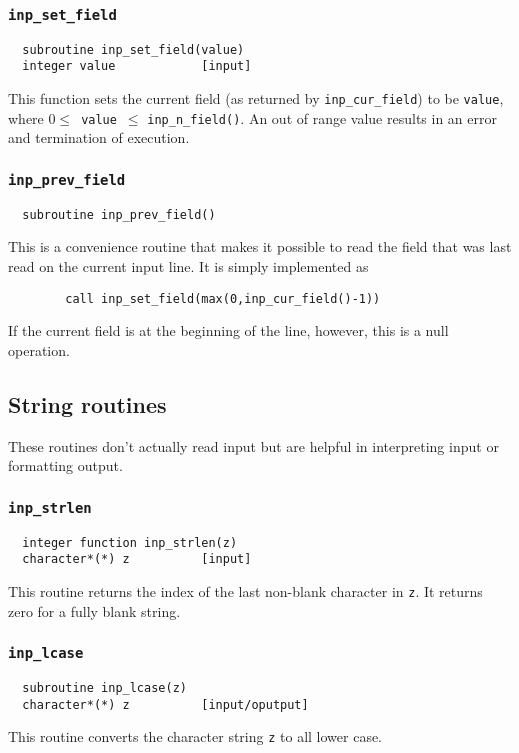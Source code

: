 \subsubsection{{\tt inp\_set\_field}}
\begin{verbatim}
  subroutine inp_set_field(value)
  integer value            [input]
\end{verbatim}
This function sets the current field (as returned by \verb+inp_cur_field+) to be
\verb+value+, where  $0 \le$~{\tt value}~$\le$ {\tt inp\_n\_field()}.  An out of
range value results in an error and termination of execution.

\subsubsection{{\tt inp\_prev\_field}}
\begin{verbatim}
  subroutine inp_prev_field()
\end{verbatim}
This is a convenience routine that makes it possible to read the field
that was last read on the current input line.  It is simply implemented as
\begin{verbatim}
        call inp_set_field(max(0,inp_cur_field()-1))
\end{verbatim}
If the current field is at the beginning of the line, however,
this is a null operation.


\subsection{String routines}
These routines don't actually read input but are helpful in
interpreting input or formatting output.

\subsubsection{{\tt inp\_strlen}}
\begin{verbatim}
  integer function inp_strlen(z)
  character*(*) z          [input]
\end{verbatim}
This routine returns the index of the last non-blank character in {\tt z}.  It
returns zero for a fully blank string.

\subsubsection{{\tt inp\_lcase}}
\begin{verbatim}
  subroutine inp_lcase(z)
  character*(*) z          [input/oputput]
\end{verbatim}
This routine converts the character string {\tt z} to all lower case.

